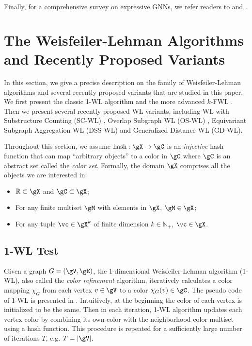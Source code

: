 \documentclass{article} %
\let\cref\crtcref
\begin{document}
Finally, for a comprehensive survey on expressive GNNs, we refer readers to \citet{sato2020survey} and \citet{morris2021weisfeiler}.

\section{The Weisfeiler-Lehman Algorithms and Recently Proposed Variants}
\label{sec:algorithms}
In this section, we give a precise description on the family of Weisfeiler-Lehman algorithms and several recently proposed variants that are studied in this paper. We first present the classic 1-WL algorithm \citep{weisfeiler1968reduction} and the more advanced $k$-FWL \citep{cai1992optimal,morris2019weisfeiler}. Then we present several recently proposed WL variants, including WL with Substructure Counting (SC-WL) \citep{bouritsas2022improving}, Overlap Subgraph WL (OS-WL) \citep{wijesinghe2022new}, Equivariant Subgraph Aggregation WL (DSS-WL) \citep{bevilacqua2022equivariant} and Generalized Distance WL (GD-WL).

Throughout this section, we assume $\operatorname{hash}:\gX\to\gC$ is an \emph{injective} hash function that can map ``arbitrary objects'' to a color in $\gC$ where $\gC$ is an abstract set called the \emph{color set}. Formally, the domain $\gX$ comprises all the objects we are interested in:
\begin{itemize}[topsep=0pt,leftmargin=30pt]
\setlength{\itemsep}{0pt}
    \item $\mathbb R\subset\gX$ and $\gC\subset \gX$;
    \item For any finite multiset $\gM$ with elements in $\gX$, $\gM\in\gX$;
    \item For any tuple $\vc\in\gX^k$ of finite dimension $k\in\mathbb N_+$, $\vc\in\gX$.
\end{itemize}

\subsection{1-WL Test}
\label{sec:1wl}
Given a graph $G=(\gV,\gE)$, the 1-dimensional Weisfeiler-Lehman algorithm (1-WL), also called the \emph{color refinement} algorithm, iteratively calculates a color mapping $\chi_G$ from each vertex $v\in \gV$ to a color $\chi_G(v)\in \gC$. The pseudo code of 1-WL is presented in \cref{alg:1wl}. Intuitively, at the beginning the color of each vertex is initialized to be the same. Then in each iteration, 1-WL algorithm updates each vertex color by combining its own color with the neighborhood color multiset using a hash function. This procedure is repeated for a sufficiently large number of iterations $T$, e.g. $T=|\gV|$.
\end{document}

